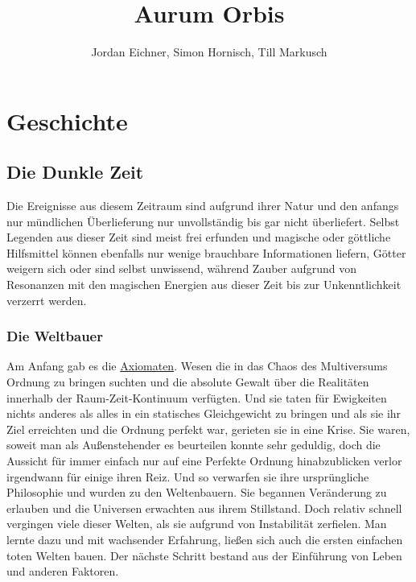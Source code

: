 \documentclass[a4paper,12pt,oneside]{book}
\title{Aurum Orbis}
\author{Jordan Eichner, Simon Hornisch, Till Markusch}
\date{}
\begin{document}
\maketitle
\tableofcontents

\part{Geschichte}
\chapter{Die Dunkle Zeit}
Die Ereignisse aus diesem Zeitraum sind aufgrund ihrer Natur und den anfangs nur mündlichen Überlieferung nur unvollständig bis gar nicht überliefert. Selbst Legenden aus dieser Zeit sind meist frei erfunden und magische oder göttliche Hilfsmittel können ebenfalls nur wenige brauchbare Informationen liefern, Götter weigern sich oder sind selbst unwissend, während Zauber aufgrund von Resonanzen mit den magischen Energien aus dieser Zeit bis zur Unkenntlichkeit verzerrt werden.

\section{Die Weltbauer}
Am Anfang gab es die \uline{Axiomaten}. Wesen die in das Chaos des Multiversums Ordnung zu bringen suchten und die absolute Gewalt über die Realitäten innerhalb der Raum-Zeit-Kontinuum verfügten.   
Und sie taten für Ewigkeiten nichts anderes als alles in ein statisches Gleichgewicht zu bringen und als sie ihr Ziel erreichten und die Ordnung perfekt war, gerieten sie in eine Krise. Sie waren, soweit man als Außenstehender es beurteilen konnte sehr geduldig, doch die Aussicht für immer einfach nur auf eine Perfekte Ordnung hinabzublicken verlor irgendwann für einige ihren Reiz. Und so verwarfen sie ihre ursprüngliche Philosophie und wurden zu den Weltenbauern. Sie begannen Veränderung zu erlauben und die Universen erwachten aus ihrem Stillstand. Doch relativ schnell vergingen viele dieser Welten, als sie aufgrund von Instabilität zerfielen. Man lernte dazu und mit wachsender Erfahrung, ließen sich auch die ersten einfachen toten Welten bauen. Der nächste Schritt bestand aus der Einführung von Leben und anderen Faktoren.
\end{document}

